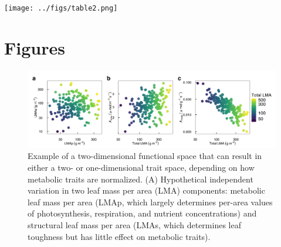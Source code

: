 \documentclass[
  12pt,
]{article}
\providecommand{\DIFaddbegin}{} %
\providecommand{\DIFaddend}{} %
\providecommand{\DIFaddbeginFL}{} %
\providecommand{\DIFdelbeginFL}{} %
\providecommand{\DIFdelendFL}{} %
\newcommand{\DIFscaledelfig}{0.5}
\newlength{\DIFdelgraphicswidth} %
\newlength{\DIFdelgraphicsheight} %
\newcommand{\DIFaddincludegraphics}[2][]{{\color{blue}\fbox{\DIFOincludegraphics[#1]{#2}}}} %
\newcommand{\DIFdelincludegraphics}[2][]{%
\sbox{\DIFdelgraphicsbox}{\DIFOincludegraphics[#1]{#2}}%
\settoboxwidth{\DIFdelgraphicswidth}{\DIFdelgraphicsbox} %
\settoboxtotalheight{\DIFdelgraphicsheight}{\DIFdelgraphicsbox} %
\scalebox{\DIFscaledelfig}{%
\parbox[b]{\DIFdelgraphicswidth}{\usebox{\DIFdelgraphicsbox}\\[-\baselineskip] \rule{\DIFdelgraphicswidth}{0em}}\llap{\resizebox{\DIFdelgraphicswidth}{\DIFdelgraphicsheight}{%
\setlength{\unitlength}{\DIFdelgraphicswidth}%
\begin{picture}(1,1)%
\thicklines\linethickness{2pt} %
{\color[rgb]{1,0,0}\put(0,0){\framebox(1,1){}}}%
{\color[rgb]{1,0,0}\put(0,0){\line( 1,1){1}}}%
{\color[rgb]{1,0,0}\put(0,1){\line(1,-1){1}}}%
\end{picture}%
}\hspace*{3pt}}} %
} %
\DeclareRobustCommand{\DIFaddbegin}{\DIFOaddbegin \let\includegraphics\DIFaddincludegraphics} %
\DeclareRobustCommand{\DIFaddend}{\DIFOaddend \let\includegraphics\DIFOincludegraphics} %
\DeclareRobustCommand{\DIFaddbeginFL}{\DIFOaddbeginFL \let\includegraphics\DIFaddincludegraphics} %
\DeclareRobustCommand{\DIFdelbeginFL}{\DIFOdelbeginFL \let\includegraphics\DIFdelincludegraphics} %
\DeclareRobustCommand{\DIFdelendFL}{\DIFOaddendFL \let\includegraphics\DIFOincludegraphics} %
\begin{document}
\DIFaddbegin \texttt{[image: ../figs/table2.png]}

\DIFaddend \newpage

\hypertarget{figures}{%
\section{Figures}\label{figures}}

\begin{figure}
\DIFdelbeginFL %
\DIFdelendFL \DIFaddbeginFL \hypertarget{fig:Hplt}{%
\centering
\includegraphics{../figs/fig_hypo.png}
\caption{Example of a two-dimensional functional space that can result in either a two- or one-dimensional trait space, depending on how metabolic traits are normalized. (A) Hypothetical independent variation in two leaf mass per area (LMA) components: metabolic leaf mass per area (LMAp, which largely determines per-area values of photosynthesis, respiration, and nutrient concentrations) and structural leaf mass per area (LMAs, which determines leaf toughness but has little effect on metabolic traits).
}}
\end{figure}
\end{document}
